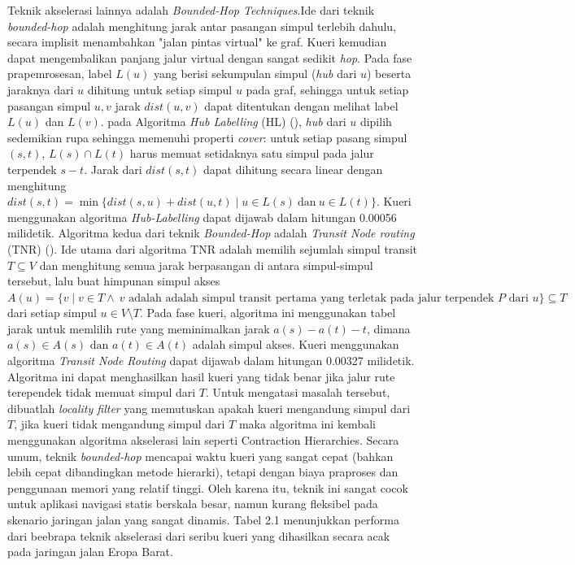 Teknik akselerasi lainnya adalah \textit{Bounded-Hop Techniques}.Ide dari teknik \textit{bounded-hop} adalah menghitung jarak antar pasangan simpul terlebih dahulu, secara implisit menambahkan "jalan pintas virtual" ke graf. Kueri kemudian dapat mengembalikan panjang jalur virtual dengan sangat sedikit \textit{hop}. Pada fase prapemrosesan, label $L(u)$ yang berisi sekumpulan simpul (\textit{hub} dari $u$) beserta jaraknya dari $u$ dihitung untuk setiap simpul $u$ pada graf, sehingga untuk setiap pasangan simpul $u,v$ jarak $dist(u,v)$ dapat ditentukan dengan melihat label $L(u)$ dan $L(v)$. pada Algoritma \textit{Hub Labelling} (HL) (\cite{Abraham2011}), \textit{hub} dari $u$ dipilih sedemikian rupa sehingga memenuhi properti \textit{cover}: untuk setiap pasang simpul $(s,t)$, $L(s)\cap L(t)$ harus memuat setidaknya satu simpul pada jalur terpendek $s-t$. Jarak dari $dist(s,t)$ dapat dihitung secara linear dengan menghitung $dist(s,t) = \min \{ dist(s,u) + dist(u,t) \mid u \in L(s) \ \text{dan} \ u \in L(t) \}$. Kueri menggunakan algoritma \textit{Hub-Labelling} dapat dijawab dalam hitungan 0.00056 milidetik. Algoritma kedua dari teknik \textit{Bounded-Hop} adalah \textit{Transit Node routing} (TNR) (\cite{Arz2013}). Ide utama dari algoritma TNR adalah memilih sejumlah simpul transit $T\subseteq V$ dan menghitung semua jarak berpasangan di antara simpul-simpul tersebut, lalu buat himpunan simpul akses $A(u)=\{v \mid v\in T \land \  v \text{ adalah adalah simpul transit pertama yang terletak pada jalur terpendek } P \text{ dari } u  \}  \subseteq T$ dari setiap simpul $u \in V \setminus T$. Pada fase kueri, algoritma ini menggunakan tabel jarak untuk memlilih rute yang meminimalkan jarak $a(s)-a(t)-t$, dimana $a(s)\in A(s) \text{ dan } a(t) \in A(t)$ adalah simpul akses. Kueri menggunakan algoritma \textit{Transit Node Routing} dapat dijawab dalam hitungan 0.00327 milidetik. Algoritma ini dapat menghasilkan hasil kueri yang tidak benar jika jalur rute terependek tidak memuat simpul dari $T$. Untuk mengatasi masalah tersebut, dibuatlah \textit{locality filter} yang memutuskan apakah kueri mengandung simpul dari $T$, jika kueri tidak mengandung simpul dari $T$ maka algoritma ini kembali menggunakan algoritma akselerasi lain seperti Contraction Hierarchies. Secara umum, teknik \textit{bounded-hop} mencapai waktu kueri yang sangat cepat (bahkan lebih cepat dibandingkan metode hierarki), tetapi dengan biaya praproses dan penggunaan memori yang relatif tinggi. Oleh karena itu, teknik ini sangat cocok untuk aplikasi navigasi statis berskala besar, namun kurang fleksibel pada skenario jaringan jalan yang sangat dinamis. Tabel 2.1 menunjukkan performa dari beebrapa teknik akselerasi dari seribu kueri yang dihasilkan secara acak pada jaringan jalan Eropa Barat.

